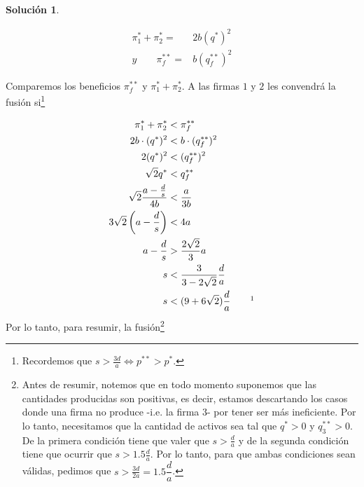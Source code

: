 \documentclass[a4paper, 11pt]{article}
\theoremstyle{definition}
\newtheorem{solucion}{Soluci\'on}
\newcommand{\p}[1]{\left(#1\right)}
\begin{document}
\begin{solucion}
\begin{enumerate}
\begin{enumerate}
\vspace*{-22pt}

\begin{align*}
\pi_1^*+\pi_2^*=&2b(q^*)^2\\
y \qquad \pi_f^{**}=&b(q_f^{**})^2
\end{align*}
 
\vspace*{-10pt}

 Comparemos los beneficios $\pi_f^{**}$ y $\pi_1^*+\pi_2^*$. A las firmas $1$ y $2$ les convendrá la fusión si\footnote{Recordemos que $s>\frac{3d}{a} \Longleftrightarrow p^{**}>p^*$.}

\vspace*{-24pt}

\begin{align*}
\pi_1^*+\pi_2^* &<\pi_f^{**}\\
2b\cdot(q^*)^2&<b\cdot(q_f^{**})^2\\
2(q^*)^2&<(q_f^{**})^2\\
\sqrt{2}q^*&<q_f^{**}\\
\sqrt{2}\dfrac{a-\frac{d}{s}}{4b}&<\dfrac{a}{3b}\\
3\sqrt{2}\p{a-\frac{d}{s}}&<4a\\
a-\frac{d}{s}&>\dfrac{2\sqrt{2}}{3}a\\
s&<\dfrac{3}{3-2\sqrt{2}}\dfrac{d}{a} \\
s&<(9+6\sqrt{2})\dfrac{d}{a}\qquad\footnotemark
\end{align*}
Por lo tanto, para resumir, la fusión\footnote{Antes de resumir, notemos que en todo momento suponemos que las cantidades producidas son positivas, es decir, estamos descartando los casos donde una firma no produce -i.e. la firma $3$- por tener ser más ineficiente. Por lo tanto, necesitamos que la cantidad de activos sea tal que $q^*>0$ y $q_3^{**}>0$. De la primera condición tiene que valer que $s>\frac{d}{a}$ y de la segunda condición tiene que ocurrir que $s>1.5\frac{d}{a}$. Por lo tanto, para que ambas condiciones sean válidas, pedimos que $s>\frac{3d}{2a}=1.5\dfrac{d}{a}$.}


\end{enumerate}
\end{enumerate}
\end{solucion}
\end{document}

